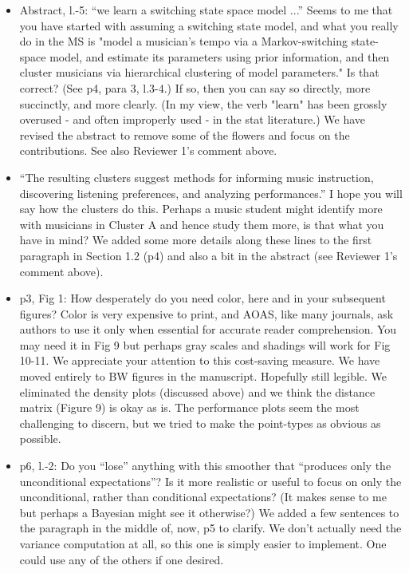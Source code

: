 \documentclass[12pt]{article}
\newcommand{\sresp}[1]{\textcolor{cobalt}{#1}}
\begin{document}
\begin{itemize}
\item Abstract, l.-5: ``we learn a switching state space model ...''
Seems to me that you have started with assuming a switching
state model, and what you really do in the MS is "model a
musician's tempo via a Markov-switching state-space model,
and estimate its parameters using prior information, and
then cluster musicians via hierarchical clustering of model
parameters." Is that correct? (See p4, para 3, l.3-4.) If 
so, then you can say so directly, more succinctly, and more 
clearly.  (In my view, the verb "learn" has been grossly 
overused - and often improperly used - in the stat literature.) \sresp{We have revised the abstract to remove some of the flowers and focus on the contributions. See also Reviewer 1's comment above.}

\item ``The resulting clusters suggest methods for informing music 
instruction, discovering listening preferences, and analyzing 
performances.''  I hope you will say how the clusters do this.
Perhaps a music student might identify more with musicians in
Cluster A and hence study them more, is that what you have in
mind?  \sresp{We added some more details along these lines to the first paragraph in Section 1.2 (p4) and also a bit in the abstract (see Reviewer 1's comment above).} 

\item p3, Fig 1: How desperately do you need color, here and in your
subsequent figures? Color is very expensive to print, and AOAS,
like many journals, ask authors to use it only when essential
for accurate reader comprehension.  You may need it in Fig 9
but perhaps gray scales and shadings will work for Fig 10-11.
We appreciate your attention to this cost-saving measure. \sresp{We have moved entirely to BW figures in the manuscript. Hopefully still legible. We eliminated the density plots (discussed above) and we think the distance matrix (Figure 9) is okay as is. The performance plots seem the most challenging to discern, but we tried to make the point-types as obvious as possible.}



\item p6, l.-2: Do you ``lose'' anything with this smoother that ``produces only 
the unconditional expectations''?  Is it more realistic or useful to focus
on only the unconditional, rather than conditional expectations? (It makes
sense to me but perhaps a Bayesian might see it otherwise?) \sresp{We added a few sentences to the paragraph in the middle of, now, p5 to clarify. We don't actually need the variance computation at all, so this one is simply easier to implement. One could use any of the others if one desired.}



\end{itemize}
\end{document}
